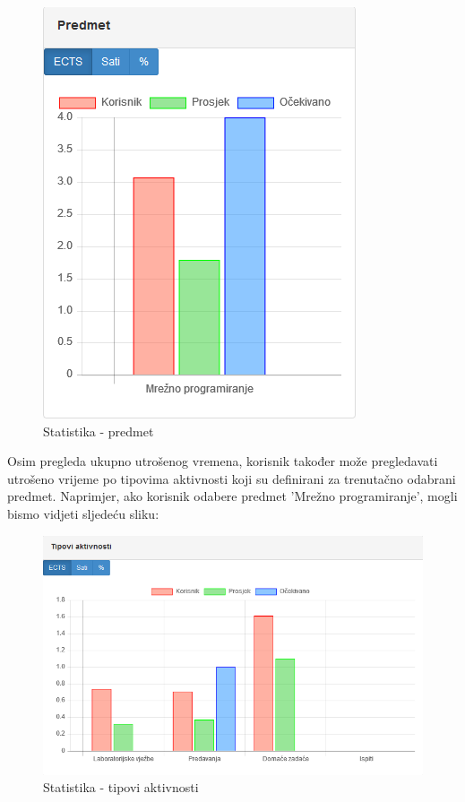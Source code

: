 \documentclass[times, utf8, zavrsni, numeric]{fer}
\begin{document}
\begin{figure}[H]
\centering
\includegraphics{img/statistika-predmet.png}
\caption{Statistika - predmet}
\label{fig:statistika-predmet}
\end{figure}

Osim pregleda ukupno utrošenog vremena, korisnik također može pregledavati utrošeno vrijeme po tipovima aktivnosti koji su definirani za trenutačno odabrani predmet. Naprimjer, ako korisnik odabere predmet 'Mrežno programiranje', mogli bismo vidjeti sljedeću sliku:

\begin{figure}[H]
\centering
\includegraphics[width=\textwidth,height=\textheight,keepaspectratio]{img/statistika-tip-aktivnosti.png}
\caption{Statistika - tipovi aktivnosti}
\label{fig:statistika-tip-aktivnosti}
\end{figure}
\end{document}
